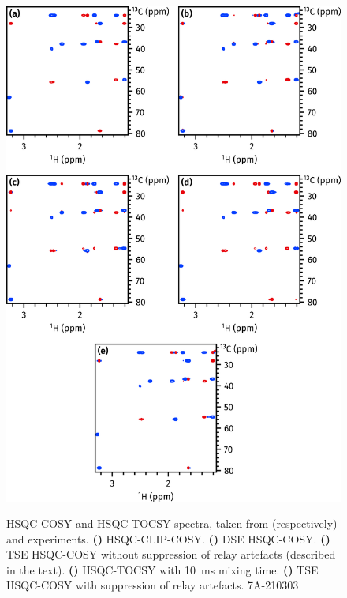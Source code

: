\documentclass[a4paper,12pt]{article}
\begin{document}
\begin{refsection}
\begin{figure}[!htp]
    \centering
    \includegraphics[]{hsqccosy_comp.png}%
    {\label{fig:hsqccosy_comp_clip}}%
    {\label{fig:hsqccosy_comp_dse}}%
    {\label{fig:hsqccosy_comp_tse_norps}}%
    {\label{fig:hsqccosy_comp_tocsy}}%
    {\label{fig:hsqccosy_comp_tse}}%
    \caption[Comparison of spectra acquired with different HSQC-COSY modules]{
        HSQC-COSY and HSQC-TOCSY spectra, taken from (respectively)  and  experiments.
        \textbf{()} HSQC-CLIP-COSY.
        \textbf{()} DSE HSQC-COSY.
        \textbf{()} TSE HSQC-COSY without suppression of relay artefacts (described in the text).
        \textbf{()} HSQC-TOCSY with \qty{10}{\ms} mixing time.
        \textbf{()} TSE HSQC-COSY with suppression of relay artefacts.
        7A-210303
    }
    \label{fig:hsqccosy_comp}
\end{figure}


\end{refsection}
\end{document}
